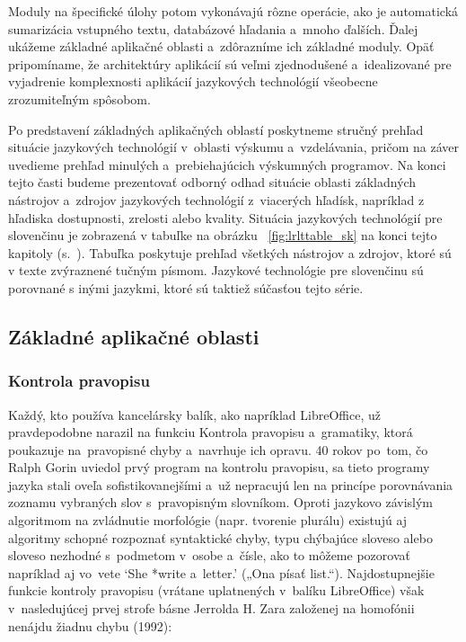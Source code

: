 \begin{multicols}{2}
Moduly na špecifické úlohy potom vykonávajú rôzne operácie, ako je
automatická sumarizácia vstupného textu, databázové hľadania
a~mnoho ďalších. Ďalej ukážeme základné aplikačné oblasti
a~zdôrazníme ich základné moduly. Opäť pripomíname,
že architektúry aplikácií sú veľmi zjednodušené a~idealizované
pre vyjadrenie komplexnosti aplikácií jazykových technológií
všeobecne zrozumiteľným spôsobom.

Po predstavení základných aplikačných oblastí poskytneme stručný prehľad
situácie jazykových technológií v~oblasti výskumu a~vzdelávania, pričom na
záver uvedieme prehľad minulých a~prebiehajúcich výskumných programov. Na konci
tejto časti budeme prezentovať odborný odhad situácie oblasti základných
nástrojov a~zdrojov jazykových technológií z~viacerých hľadísk, napríklad z
hľadiska dostupnosti, zrelosti alebo kvality. Situácia jazykových technológií
pre slovenčinu je zobrazená v tabuľke na obrázku ~\ref{fig:lrlttable_sk} na konci tejto
kapitoly (s.~\pageref{fig:lrlttable_sk}). Tabuľka poskytuje prehľad všetkých
nástrojov a zdrojov, ktoré sú v texte zvýraznené tučným písmom. Jazykové
technológie pre slovenčinu sú porovnané s inými jazykmi, ktoré sú taktiež
súčasťou tejto série. 

\subsection{Základné aplikačné oblasti}
\subsubsection{Kontrola pravopisu}
Každý, kto používa kancelársky balík, ako napríklad LibreOffice, už pravdepodobne narazil na funkciu Kontrola pravopisu a~gramatiky, ktorá poukazuje na~pravopisné chyby a~navrhuje ich opravu. 40 rokov po~tom, čo Ralph Gorin uviedol prvý program na kontrolu pravopisu, sa tieto programy jazyka stali oveľa sofistikovanejšími a~už nepracujú len na princípe porovnávania zoznamu vybraných slov s~pravopisným slovníkom. Oproti jazykovo závislým algoritmom na zvládnutie morfológie (napr. tvorenie plurálu) existujú aj algoritmy schopné rozpoznať syntaktické chyby, typu chýbajúce sloveso alebo sloveso nezhodné s~podmetom v~osobe a~čísle, ako to môžeme pozorovať napríklad aj vo~vete ‘She *write a~letter.’ („Ona písať list.“). Najdostupnejšie funkcie kontroly pravopisu (vrátane uplatnených v~balíku LibreOffice) však v~nasledujúcej prvej strofe básne Jerrolda H. Zara založenej na homofónii nenájdu žiadnu chybu (1992)\cite{f22}:


\end{multicols}
